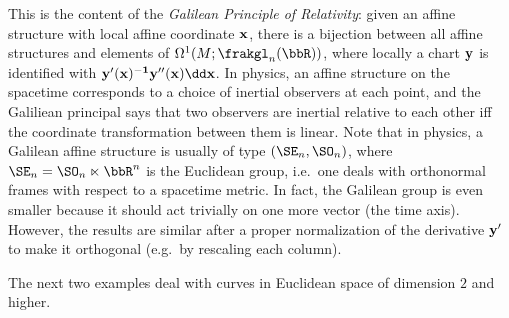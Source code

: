 \begin{example}
    This is the content of the \emph{Galilean Principle of Relativity}: given an affine structure with local affine coordinate $\bf{x}$, there is a bijection between all affine structures and elements of $\Omega^1(M;\frakgl_n(\bbR))$, where locally a chart $\bf{y}$ is identified with $\bf{y}'(\bf{x})^{-1}\bf{y}''(\bf{x})\dd \bf{x}$. In physics, an affine structure on the spacetime corresponds to a choice of inertial observers at each point, and the Galiliean principal says that two observers are inertial relative to each other iff the coordinate transformation between them is linear. Note that in physics, a Galilean affine structure is usually of type $(\SE_n,\SO_n)$, where $\SE_n=\SO_n\ltimes\bbR^n$ is the Euclidean group, i.e.\ one deals with orthonormal frames with respect to a spacetime metric. In fact, the Galilean group is even smaller because it should act trivially on one more vector (the time axis). However, the results are similar after a proper normalization of the derivative $\bf{y}'$ to make it orthogonal (e.g.\ by rescaling each column).
\end{example}

The next two examples deal with curves in Euclidean space of dimension $2$ and higher.

